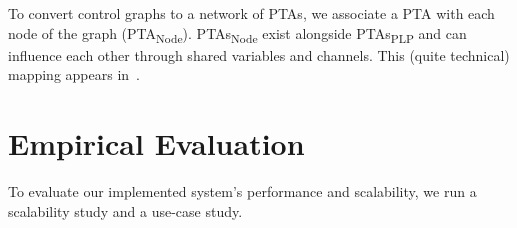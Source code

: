 \documentclass[letterpaper]{article}
\newcommand{\frameImage}[4]{
\begin{figure}[H] 
  \centerline{
    \fcolorbox{frameColor}{white}{
        \texttt{[image: \#1]} } }
    \caption{#4}
    \label{fig:#1}
\end{figure}
}
\begin{document}
To convert control graphs to a network of PTAs, we associate a PTA with each node of the graph (PTA\textsubscript{Node}). PTAs\textsubscript{Node} exist alongside PTAs\textsubscript{PLP} and can influence each other through shared variables and channels.
This (quite technical) mapping appears in~\cite{kovalchu2018}. 





\section{Empirical Evaluation}
To evaluate our implemented system's performance and scalability,
we run a scalability study and a use-case study.




%


%



\end{document}
